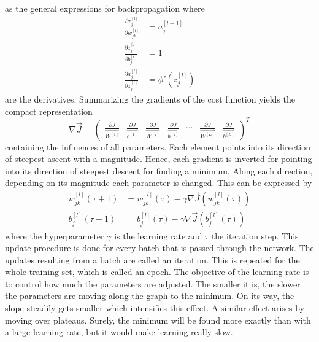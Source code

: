 as the general expressions for backpropagation where
\begin{subequations}
	\begin{align}
		\frac{\partial z^{[l]}_j}{\partial w^{[l]}_{jk}} &= a^{[l-1]}_j \\
		\frac{\partial z^{[l]}_j}{\partial b^{[l]}_j} &= 1 \\
		\frac{\partial a^{[l]}_{j}}{\partial z^{[l]}_{j}} &= \phi'(z^{[l]}_j)
	\end{align}
\end{subequations}
are the derivatives.
Summarizing the gradients of the cost function yields the compact representation
\begin{equation}
	\label{eq:cost-gradient}
	\nabla \vec{J} =
	\begin{pmatrix}
		\frac{\partial J}{\vec{W^{[1]}}} &
		\frac{\partial J}{\vec{b^{[1]}}} &
		\frac{\partial J}{\vec{W^{[2]}}} &
		\frac{\partial J}{\vec{b^{[2]}}} &
		\cdots &
		\frac{\partial J}{\vec{W^{[L]}}} &
		\frac{\partial J}{\vec{b^{[L]}}}
	\end{pmatrix}^T
\end{equation}
containing the influences of all parameters.
Each element points into its direction of steepest ascent with a magnitude.
Hence, each gradient is inverted for pointing into its direction of steepest descent for finding a minimum.
Along each direction, depending on its magnitude each parameter is changed.
This can be expressed by
\begin{subequations}
	\label{eq:learning-rate}
	\begin{align}
		w^{[l]}_{jk}(\tau + 1) &= w^{[l]}_{jk}(\tau) - \gamma \nabla \vec{J}(w^{[l]}_{jk}(\tau)) \\
		b^{[l]}_j(\tau + 1) &= b^{[l]}_j(\tau) - \gamma \nabla \vec{J}(b^{[l]}_j(\tau))
	\end{align}
\end{subequations}
where the hyperparameter $\gamma$ is the learning rate and $\tau$ the iteration step.
This update procedure is done for every batch that is passed through the network.
The updates resulting from a batch are called an iteration.
This is repeated for the whole training set, which is called an epoch.
The objective of the learning rate is to control how much the parameters are adjusted.
The smaller it is, the slower the parameters are moving along the graph to the minimum.
On its way, the slope steadily gets smaller which intensifies this effect.
A similar effect arises by moving over plateaus.
Surely, the minimum will be found more exactly than with a large learning rate, but it would make learning really slow.

